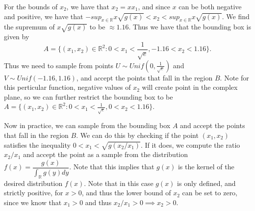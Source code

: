 \documentclass{article}
\theoremstyle{definition}
\theoremstyle{remark}
\begin{document}
For the bounds of $x_2$, we have that $x_2 = xx_1$, and since $x$ can be both negative and positive, we have that $ -sup_{x\in \mathbb{R}} x \sqrt{g(x)}< x_2 < sup_{x\in \mathbb{R}} x \sqrt{g(x)}$. We find the supremum of $x\sqrt{g(x)}$ to be $\approx 1.16$. Thus we have that the bounding box is given by
\begin{equation}
    A = \{(x_1,x_2) \in \mathbb{R}^2 : 0 < x_1 < \frac{1}{\sqrt{e}}, -1.16 < x_2 < 1.16\}.
\end{equation}
Thus we need to sample from points $U \sim Unif(0, \frac{1}{\sqrt{e}})$ and $V \sim Unif(-1.16, 1.16)$, and accept the points that fall in the region $B$. Note for this perticular function, negative values of $x_2$ will create point in the complex plane, so we can further restrict the bounding box to be $A = \{(x_1,x_2) \in \mathbb{R}^2 : 0 < x_1 < \frac{1}{\sqrt{e}}, 0 < x_2 < 1.16\}$.


\begin{center}
    

\end{center}
Now in practice, we can sample from the bounding box $A$ and accept the points that fall in the region $B$. We can do this by checking if the point $(x_1,x_2)$ satisfies the inequality $0 < x_1 < \sqrt{g(x_2/x_1)}$. If it does, we compute the ratio $x_2/x_1$ and accept the point as a sample from the distribution $f(x) = \dfrac{g(x)}{\int_\mathbb{R}g(y)dy}$. Note that this implies that $g(x)$ is the kernel of the desired distribution $f(x)$. Note that in this case $g(x)$ is only defined, and strictly positive, for $x > 0$, and thus the lower bound of $x_2$ can be set to zero, since we know that $x_1 > 0$ and thus $x_2/x_1 > 0 \implies x_2 > 0$. 
\end{document}
